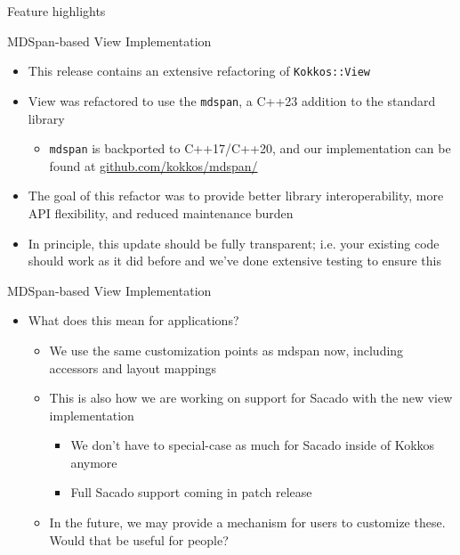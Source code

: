 
\begin{frame}[fragile]

  {\Huge Feature highlights}

  \vspace{10pt}

\end{frame}

\begin{frame}[fragile]{MDSpan-based View Implementation}
  \begin{itemize}
    \item This release contains an extensive refactoring of \texttt{Kokkos::View}
    \item View was refactored to use the \texttt{mdspan}, a C++23 addition to the standard library
    \begin{itemize}
      \item \texttt{mdspan} is backported to C++17/C++20, and our implementation can be found at \url{github.com/kokkos/mdspan/}
    \end{itemize}
    \item The goal of this refactor was to provide better library interoperability, more API flexibility, and reduced maintenance burden
    \item In principle, this update should be fully transparent; i.e. your existing code should work as it did before and we've done extensive testing to ensure this
    \end{itemize}
\end{frame}

\begin{frame}[fragile]{MDSpan-based View Implementation}
  \begin{itemize}
  \item What does this mean for applications?
  \begin{itemize}
    \item We use the same customization points as mdspan now, including accessors and layout mappings
    \item This is also how we are working on support for Sacado with the new view implementation
    \begin{itemize}
      \item We don't have to special-case as much for Sacado inside of Kokkos anymore
      \item Full Sacado support coming in patch release
    \end{itemize}
    \item In the future, we may provide a mechanism for users to customize these. Would that be useful for people?
  \end{itemize}
  \end{itemize}
\end{frame}

